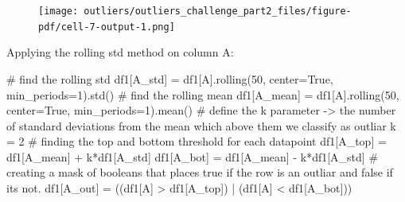 \documentclass[
  letterpaper,
  DIV=11,
  numbers=noendperiod,
  oneside]{scrreprt}
\newenvironment{Shaded}{\begin{snugshade}}{\end{snugshade}}
\newcommand{\CommentTok}[1]{\textcolor[rgb]{0.37,0.37,0.37}{#1}}
\newcommand{\DecValTok}[1]{\textcolor[rgb]{0.68,0.00,0.00}{#1}}
\newcommand{\NormalTok}[1]{\textcolor[rgb]{0.00,0.23,0.31}{#1}}
\newcommand{\OperatorTok}[1]{\textcolor[rgb]{0.37,0.37,0.37}{#1}}
\newcommand{\StringTok}[1]{\textcolor[rgb]{0.13,0.47,0.30}{#1}}
\newcommand{\VariableTok}[1]{\textcolor[rgb]{0.07,0.07,0.07}{#1}}
\begin{document}
\begin{figure}[H]

{\centering \texttt{[image: outliers/outliers\_challenge\_part2\_files/figure-pdf/cell-7-output-1.png]}

}

\end{figure}

Applying the rolling std method on column A:

\begin{Shaded}
\begin{Highlighting}[]
\CommentTok{\# find the rolling std}
\NormalTok{df1[}\StringTok{\textquotesingle{}A\_std\textquotesingle{}}\NormalTok{] }\OperatorTok{=}\NormalTok{ df1[}\StringTok{\textquotesingle{}A\textquotesingle{}}\NormalTok{].rolling(}\DecValTok{50}\NormalTok{, center}\OperatorTok{=}\VariableTok{True}\NormalTok{, min\_periods}\OperatorTok{=}\DecValTok{1}\NormalTok{).std()}
\CommentTok{\# find the rolling mean}
\NormalTok{df1[}\StringTok{\textquotesingle{}A\_mean\textquotesingle{}}\NormalTok{] }\OperatorTok{=}\NormalTok{ df1[}\StringTok{\textquotesingle{}A\textquotesingle{}}\NormalTok{].rolling(}\DecValTok{50}\NormalTok{, center}\OperatorTok{=}\VariableTok{True}\NormalTok{, min\_periods}\OperatorTok{=}\DecValTok{1}\NormalTok{).mean()}
\CommentTok{\# define the k parameter {-}\textgreater{} the number of standard deviations from the mean which above them we classify as outliar}
\NormalTok{k }\OperatorTok{=} \DecValTok{2}
\CommentTok{\# finding the top and bottom threshold for each datapoint}
\NormalTok{df1[}\StringTok{\textquotesingle{}A\_top\textquotesingle{}}\NormalTok{] }\OperatorTok{=}\NormalTok{ df1[}\StringTok{\textquotesingle{}A\_mean\textquotesingle{}}\NormalTok{] }\OperatorTok{+}\NormalTok{ k}\OperatorTok{*}\NormalTok{df1[}\StringTok{\textquotesingle{}A\_std\textquotesingle{}}\NormalTok{]}
\NormalTok{df1[}\StringTok{\textquotesingle{}A\_bot\textquotesingle{}}\NormalTok{] }\OperatorTok{=}\NormalTok{ df1[}\StringTok{\textquotesingle{}A\_mean\textquotesingle{}}\NormalTok{] }\OperatorTok{{-}}\NormalTok{ k}\OperatorTok{*}\NormalTok{df1[}\StringTok{\textquotesingle{}A\_std\textquotesingle{}}\NormalTok{]}
\CommentTok{\# creating a mask of booleans that places true if the row is an outliar and false if its not.}
\NormalTok{df1[}\StringTok{\textquotesingle{}A\_out\textquotesingle{}}\NormalTok{] }\OperatorTok{=}\NormalTok{ ((df1[}\StringTok{\textquotesingle{}A\textquotesingle{}}\NormalTok{] }\OperatorTok{\textgreater{}}\NormalTok{ df1[}\StringTok{\textquotesingle{}A\_top\textquotesingle{}}\NormalTok{]) }\OperatorTok{|}\NormalTok{ (df1[}\StringTok{\textquotesingle{}A\textquotesingle{}}\NormalTok{] }\OperatorTok{\textless{}}\NormalTok{ df1[}\StringTok{\textquotesingle{}A\_bot\textquotesingle{}}\NormalTok{]))}

\end{Highlighting}
\end{Shaded}
\end{document}
